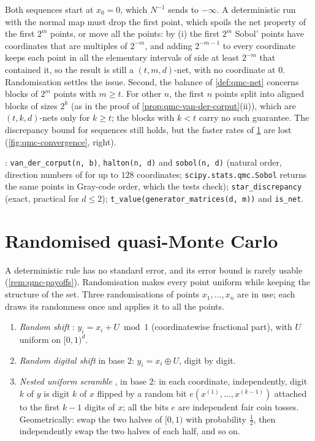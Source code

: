 \begin{remark}\label{rem:qmc-origin}
Both sequences start at $x_0=0$, which $N^{-1}$ sends to $-\infty$. A deterministic run with
the normal map must drop the first point, which spoils the net property of the first $2^m$
points, or move all the points: by (i) the first $2^m$ Sobol' points have coordinates that are
multiples of $2^{-m}$, and adding $2^{-m-1}$ to every coordinate keeps each point in all the
elementary intervals of side at least $2^{-m}$ that contained it, so the result is still a
$(t,m,d)$-net, with no coordinate at $0$. Randomisation settles the issue. Second, the balance of
\cref{def:qmc-net} concerns blocks of $2^m$ points with $m\ge t$. For other $n$, the first $n$
points split into aligned blocks of sizes $2^k$ (as in the proof of
\cref{prop:qmc-van-der-corput}(ii)), which are $(t,k,d)$-nets only for $k\ge t$; the blocks with
$k<t$ carry no such guarantee. The discrepancy bound for sequences still holds, but the faster
rates of \cref{sec:qmc-rqmc} are lost (\cref{fig:qmc-convergence}, right).
\end{remark}

\begin{incode}
: \texttt{van\_der\_corput(n, b)}, \texttt{halton(n, d)} and
\texttt{sobol(n, d)} (natural order, direction numbers of \citeauthor{joe-kuo-2008} for up to
$128$ coordinates; \texttt{scipy.stats.qmc.Sobol} returns the same points in Gray-code order,
which the tests check); \texttt{star\_discrepancy} (exact, practical for $d\le2$);
\texttt{t\_value(generator\_matrices(d, m))} and \texttt{is\_net}.
\end{incode}

\section{Randomised quasi-Monte Carlo}\label{sec:qmc-rqmc}

A deterministic rule has no standard error, and its error bound is rarely usable
(\cref{rem:qmc-payoffs}). Randomisation makes every point uniform while keeping the
structure of the set. Three randomisations of points $x_1,\dots,x_n$ are in use; each draws its
randomness once and applies it to all the points.
\begin{enumerate}[label=(\alph*)]
  \item \emph{Random shift} \citep{cranley-patterson}: $y_i=x_i+U\bmod1$ (coordinatewise
    fractional part), with $U$ uniform on $[0,1)^d$.
  \item \emph{Random digital shift} in base $2$: $y_i=x_i\oplus U$, digit by digit.
  \item \emph{Nested uniform scramble} \citep{owen-1995}, in base $2$: in each coordinate,
    independently, digit $k$ of $y$ is digit $k$ of $x$ flipped by a random bit
    $e(x^{(1)},\dots,x^{(k-1)})$ attached to the first $k-1$ digits of $x$; all the bits $e$ are
    independent fair coin tosses. Geometrically: swap the two halves of $[0,1)$ with probability
    $\frac12$, then independently swap the two halves of each half, and so on.
\end{enumerate}

